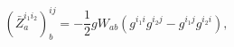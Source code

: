 \begin{equation}
\left( \bar{Z}_{a}^{i_{1}i_{2}}\right) _{b}^{ij}=-\frac{1}{2}gW_{ab}\left(
g^{i_{1}i}g^{i_{2}j}-g^{i_{1}j}g^{i_{2}i}\right) ,  \label{i15a}
\end{equation}


